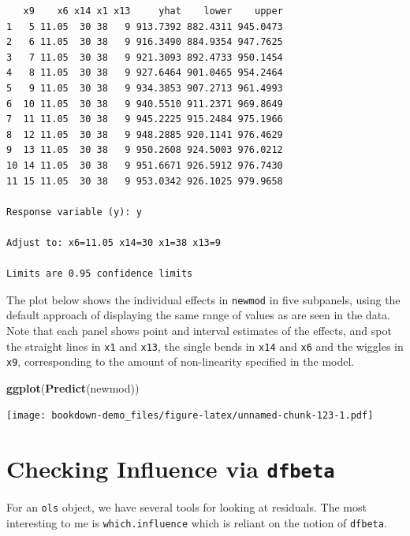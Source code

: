 \documentclass[]{book}
\newenvironment{Shaded}{\begin{snugshade}}{\end{snugshade}}
\newcommand{\KeywordTok}[1]{\textcolor[rgb]{0.13,0.29,0.53}{\textbf{#1}}}
\newcommand{\NormalTok}[1]{#1}
\theoremstyle{definition}
\theoremstyle{definition}
\theoremstyle{definition}
\theoremstyle{remark}
\begin{document}
\begin{verbatim}
   x9    x6 x14 x1 x13     yhat    lower    upper
1   5 11.05  30 38   9 913.7392 882.4311 945.0473
2   6 11.05  30 38   9 916.3490 884.9354 947.7625
3   7 11.05  30 38   9 921.3093 892.4733 950.1454
4   8 11.05  30 38   9 927.6464 901.0465 954.2464
5   9 11.05  30 38   9 934.3853 907.2713 961.4993
6  10 11.05  30 38   9 940.5510 911.2371 969.8649
7  11 11.05  30 38   9 945.2225 915.2484 975.1966
8  12 11.05  30 38   9 948.2885 920.1141 976.4629
9  13 11.05  30 38   9 950.2608 924.5003 976.0212
10 14 11.05  30 38   9 951.6671 926.5912 976.7430
11 15 11.05  30 38   9 953.0342 926.1025 979.9658

Response variable (y): y 

Adjust to: x6=11.05 x14=30 x1=38 x13=9  

Limits are 0.95 confidence limits
\end{verbatim}

The plot below shows the individual effects in \texttt{newmod} in five
subpanels, using the default approach of displaying the same range of
values as are seen in the data. Note that each panel shows point and
interval estimates of the effects, and spot the straight lines in
\texttt{x1} and \texttt{x13}, the single bends in \texttt{x14} and
\texttt{x6} and the wiggles in \texttt{x9}, corresponding to the amount
of non-linearity specified in the model.

\begin{Shaded}
\begin{Highlighting}[]
\KeywordTok{ggplot}\NormalTok{(}\KeywordTok{Predict}\NormalTok{(newmod))}
\end{Highlighting}
\end{Shaded}

\texttt{[image: bookdown-demo\_files/figure-latex/unnamed-chunk-123-1.pdf]}

\section{\texorpdfstring{Checking Influence via
\texttt{dfbeta}}{Checking Influence via dfbeta}}\label{checking-influence-via-dfbeta}

For an \texttt{ols} object, we have several tools for looking at
residuals. The most interesting to me is \texttt{which.influence} which
is reliant on the notion of \texttt{dfbeta}.
\end{document}
